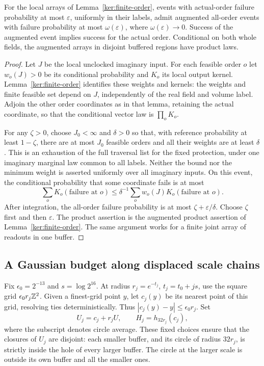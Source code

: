 \begin{lemma}\label{ann:all-orders}
For the local arrays of Lemma~\ref{ker:finite-order}, events with
actual-order failure probability at most \(\varepsilon\), uniformly
in their labels, admit augmented all-order events with failure
probability at most \(\omega(\varepsilon)\), where
\(\omega(\varepsilon)\to0\).  Success of the augmented event implies
success for the actual order.  Conditional on both whole fields,
the augmented arrays in disjoint buffered regions have product laws.
\end{lemma}

\begin{proof}
Let \(J\) be the local unclocked imaginary input.  For each feasible
order \(o\) let \(w_o(J)>0\) be its conditional probability and
\(K_o\) its local output kernel.  Lemma~\ref{ker:finite-order}
identifies these weights and kernels: the weights and finite feasible
set depend on \(J\), independently of the real field and volume
label.  Adjoin the other order coordinates as in that lemma, retaining
the actual coordinate, so that the conditional vector law is
\(\prod_oK_o\).

For any \(\zeta>0\), choose \(J_0<\infty\) and \(\delta>0\)
so that, with reference probability at least \(1-\zeta\), there
are at most \(J_0\) feasible orders and all their weights are at
least \(\delta\). This is an exhaustion of the full traversal list for
the fixed protection, under one imaginary marginal law common to all labels.
Neither the bound nor the minimum weight is asserted uniformly over
all imaginary inputs.
On this event, the conditional probability that some coordinate
fails is at most
\[
 \sum_oK_o(\text{failure at }o)
 \le\delta^{-1}\sum_ow_o(J)K_o(\text{failure at }o).
\]
After integration, the all-order failure probability is at most
\(\zeta+\varepsilon/\delta\).  Choose \(\zeta\) first and then
\(\varepsilon\).  The product assertion is the augmented product
assertion of Lemma~\ref{ker:finite-order}.  The same argument works
for a finite joint array of readouts in one buffer.
\end{proof}

\subsection{A Gaussian budget along displaced scale chains}

Fix \(\epsilon_0=2^{-13}\) and \(s=\log 2^{16}\).
At radius \(r_j=e^{-t_j}\), \(t_j=t_0+js\), use the square grid
\(\epsilon_0r_j\mathbb Z^2\).
Given a finest-grid point \(y\), let \(c_j(y)\) be its nearest
point of this grid, resolving ties deterministically.
Thus \(|c_j(y)-y|\le\epsilon_0r_j\).
Set
\begin{equation}
 U_j=c_j+r_jU,\qquad
 H_j=h_{32r_j}(c_j),
 \label{ann:coarse-values}
\end{equation}
where the subscript denotes circle average.  These fixed choices
ensure that the closures of \(U_j\) are disjoint: each smaller buffer,
and its circle of radius \(32r_j\), is strictly inside the hole of
every larger buffer.  The circle at the larger scale is outside its
own buffer and all the smaller ones.

